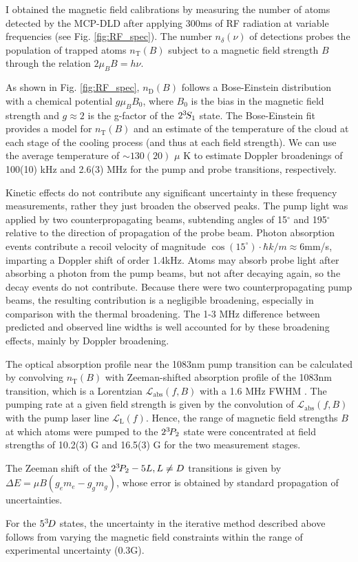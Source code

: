 {I obtained the magnetic field calibrations by measuring the number of atoms detected by the MCP-DLD after applying 300ms of RF radiation at variable frequencies (see Fig. \ref{fig:RF_spec}).
The number $n_\delta(\nu)$ of detections probes the population of trapped atoms $n_\text{T}(B)$ subject to a magnetic field strength $B$ through the relation $2 \mu_B B = h \nu$.
	
As shown in Fig.
	\ref{fig:RF_spec}, $n_\text{D}(B)$ follows a Bose-Einstein distribution with a chemical potential $g \mu_B B_0$, where $B_0$ is the bias in the magnetic field strength and $g\approx2$ is the g-factor of the $2^{3\!} S_1$ state.
	The Bose-Einstein fit provides a model for $n_\text{T}(B)$ and an estimate of the temperature of the cloud at each stage of the cooling process (and thus at each field strength).
	We can use the average temperature of $\sim130(20)$ $\mu$ K to estimate  Doppler broadenings of 100(10) kHz and 2.6(3) MHz for the pump and probe transitions, respectively.

	Kinetic effects do not contribute any significant uncertainty in these frequency measurements, rather they just broaden the observed peaks.
	The pump light was applied by two counterpropagating beams, subtending angles of 15$^\circ$ and 195$^\circ$ relative to the direction of propagation of the probe beam.
	Photon absorption events contribute a recoil velocity of magnitude $\cos(15^\circ)\cdot\hbar k/m\approx6$mm/s, imparting a Doppler shift of order 1.4kHz.
	Atoms may absorb probe light after absorbing a photon from the pump beams, but not after decaying again, so the decay events do not contribute.
	Because there were two counterpropagating pump beams, the resulting contribution is a negligible broadening, especially in comparison with the thermal broadening.
	The 1-3 MHz difference between predicted and observed line widths is well accounted for by these broadening effects, mainly by Doppler broadening.

	The optical absorption profile near the 1083nm pump transition can be calculated by convolving $n_\text{T}(B)$ with Zeeman-shifted absorption profile of the 1083nm transition, which is a Lorentzian $\mathcal{L}_\text{abs}(f,B)$ with a 1.6 MHz FWHM \cite{Drake07}.
	The pumping rate at a given field strength is given by the convolution of $\mathcal{L}_\text{abs}(f,B)$ with the pump laser line $\mathcal{L}_\text{L}(f)$.
	Hence, the range of magnetic field strengths $B$ at which atoms were pumped to the $2^{3\!} P_2$ state were concentrated at field strengths of 10.2(3) G and 16.5(3) G for the two measurement stages.

	The Zeeman shift of the $2^{3\!} P_2 - 5L, L\neq D$ transitions is given by $\Delta E = \mu B (g_e m_e-g_g m_g)$, whose error is obtained by standard propagation of uncertainties.
	
	For the $5^{3\!} D$ states, the uncertainty in the iterative method described above follows from varying the magnetic field constraints within the range of experimental uncertainty ($0.3$G). }


